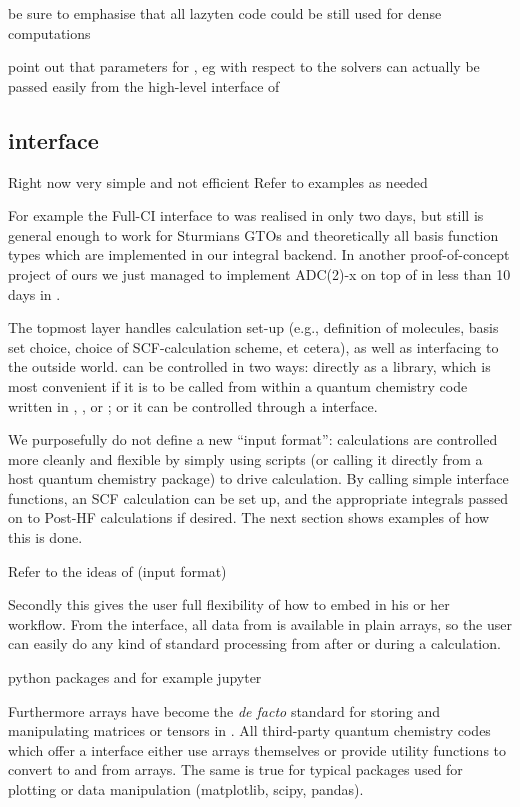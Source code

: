 be sure to emphasise that all lazyten code could be still used for dense computations

point out that parameters for \lazyten, eg with respect to the solvers
can actually be passed easily from the high-level \python interface of \molsturm

\subsection{\molsturm \python interface}

Right now very simple and not efficient
Refer to examples as needed

For example the Full-CI interface to \pyscf was realised in only two days,
but still is general enough to work for Sturmians GTOs and theoretically
all basis function types which are implemented in our integral backend.
In another proof-of-concept project of ours we just managed to
implement ADC(2)-x on top of \molsturm in less than 10 days in \python.


The topmost \molsturm layer handles calculation set-up 
(e.g., definition of molecules, basis set choice, choice 
of SCF-calculation scheme, et cetera), as well as interfacing 
to the outside world. \molsturm can be controlled in two ways: 
directly as a \cpp library, which is most convenient if it is to 
be called from within a quantum chemistry code written in \cee, \cpp, 
or \fortran; or it can be controlled through a \python interface.

We purposefully do not define a new ``input format'': calculations are 
controlled more cleanly and flexible by simply using
\python scripts (or calling it directly from a host quantum 
chemistry package) to drive calculation.
By calling simple interface functions, an SCF calculation can be set
up, and the appropriate integrals passed on to Post-HF calculations
if desired. The next section shows examples of how this is done.

Refer to the ideas of \pyscf
(input format)

Secondly this gives the user full flexibility
of how to embed \molsturm in his or her workflow.
From the \python interface, all data from \molsturm is available
in plain \numpy arrays, so the user can easily do
any kind of standard processing from \python
after or during a calculation.

python packages and for example jupyter


Furthermore \numpy arrays have become the \textit{de facto} standard
for storing and manipulating matrices or tensors in \python.
All third-party quantum chemistry codes which
offer a \python interface
either use \numpy arrays themselves or
provide utility functions to convert to and
from \numpy arrays.
The same is true for typical \python packages used for plotting or
data manipulation (matplotlib, scipy, pandas).

